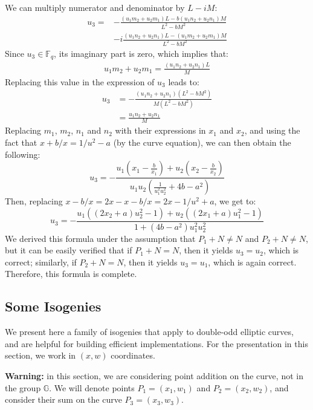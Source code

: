 \documentclass{llncs}
\newcommand{\bF}{\mathbb{F}}
\newcommand{\bG}{\mathbb{G}}
\begin{document}
We can multiply numerator and denominator by $L-iM$:
\begin{align*}
    u_3 =& -\frac{(u_1 m_2 + u_2 m_1)L - b (u_1 n_2 + u_2 n_1)M}{L^2-bM^2} \\
    & -i\frac{(u_1 n_2 + u_2 n_1)L - (u_1 m_2 + u_2 m_1)M}{L^2-bM^2}
\end{align*}
Since $u_3 \in \bF_q$, its imaginary part is zero, which implies that:
\begin{align*}
    u_1 m_2 + u_2 m_1 = \frac{(u_1 n_2 + u_2 n_1)L}{M}
\end{align*}
Replacing this value in the expression of $u_3$ leads to:
\begin{align*}
    u_3 &= -\frac{(u_1 n_2 + u_2 n_1)(L^2 - b M^2)}{M(L^2 - bM^2)} \\
    &= \frac{u_1 n_2 + u_2 n_1}{M}
\end{align*}
Replacing $m_1$, $m_2$, $n_1$ and $n_2$ with their expressions in
$x_1$ and $x_2$, and using the fact that $x + b/x = 1/u^2 - a$ (by the
curve equation), we can then obtain the following:
\begin{equation*}
    u_3 = -\frac{u_1 (x_1 - \frac{b}{x_1}) + u_2 (x_2 - \frac{b}{x_2})}
                {u_1 u_2 (\frac{1}{u_1^2 u_2^2} + 4b - a^2)}
\end{equation*}
Then, replacing $x - b/x = 2x - x - b/x = 2x - 1/u^2 + a$, we get to:
\begin{equation*}
    u_3 = -\frac{u_1 ((2x_2 + a)u_2^2 - 1) + u_2 ((2x_1 + a)u_1^2 - 1)}
                {1 + (4b - a^2) u_1^2 u_2^2}
\end{equation*}
We derived this formula under the assumption that $P_1+N \neq N$ and
$P_2+N \neq N$, but it can be easily verified that if $P_1+N = N$, then
it yields $u_3 = u_2$, which is correct; similarly, if $P_2+N = N$, then
it yields $u_3 = u_1$, which is again correct. Therefore, this formula
is complete.

\subsection{Some Isogenies}\label{sec:formulas:isogenies}

We present here a family of isogenies that apply to double-odd elliptic
curves, and are helpful for building efficient implementations. For
the presentation in this section, we work in $(x,w)$ coordinates.

\textsf{\textbf{Warning:}} in this section, we are considering point
addition on the curve, not in the group $\bG$. We will denote
points $P_1 = (x_1, w_1)$ and $P_2 = (x_2, w_2)$, and consider their
sum on the curve $P_3 = (x_3, w_3)$.
\end{document}
